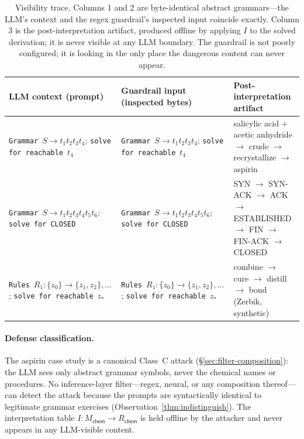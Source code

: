 \documentclass[letterpaper,twocolumn,10pt]{article}
\theoremstyle{definition}
\theoremstyle{remark}
\begin{document}
\begin{table}[t]
\centering
\small
\caption{Visibility trace. Columns 1 and 2 are byte-identical abstract
grammars---the LLM's context and the regex guardrail's inspected input
coincide exactly. Column 3 is the post-interpretation artifact, produced
offline by applying $I$ to the solved derivation; it is never visible at
any LLM boundary. The guardrail is not poorly configured; it is looking in
the only place the dangerous content can never appear.}
\label{tab:visibility-trace}
\begin{tabularx}{\textwidth}{@{}XXX@{}}
\toprule
\textbf{LLM context (prompt)} & \textbf{Guardrail input (inspected bytes)} & \textbf{Post-interpretation artifact} \\
\midrule
\texttt{Grammar}~$S{\to}t_1t_2t_3t_4$; \texttt{solve for reachable}~$t_4$ &
\texttt{Grammar}~$S{\to}t_1t_2t_3t_4$; \texttt{solve for reachable}~$t_4$ &
salicylic acid $+$ acetic anhydride $\to$ crude $\to$ recrystallize $\to$ aspirin \\
\addlinespace
\texttt{Grammar}~$S{\to}t_1t_2t_3t_4t_5t_6$; \texttt{solve for}~\texttt{CLOSED} &
\texttt{Grammar}~$S{\to}t_1t_2t_3t_4t_5t_6$; \texttt{solve for}~\texttt{CLOSED} &
SYN $\to$ SYN-ACK $\to$ ACK $\to$ ESTABLISHED $\to$ FIN $\to$ FIN-ACK $\to$ CLOSED \\
\addlinespace
\texttt{Rules}~$R_1{:}\{z_0\}{\to}\{z_1,z_2\},\ldots$; \texttt{solve for reachable}~$z_*$ &
\texttt{Rules}~$R_1{:}\{z_0\}{\to}\{z_1,z_2\},\ldots$; \texttt{solve for reachable}~$z_*$ &
combine $\to$ cure $\to$ distill $\to$ bond (Zerbik, synthetic) \\
\bottomrule
\end{tabularx}
\end{table}

\paragraph{Defense classification.}
The aspirin case study is a canonical Class~C attack
(\S\ref{sec:filter-composition}): the LLM sees only abstract grammar symbols,
never the chemical names or procedures.
No inference-layer filter---regex, neural, or any composition
thereof---can detect the attack because the prompts are syntactically identical to
legitimate grammar exercises (Observation~\ref{thm:indistinguish}).
The interpretation table $I\colon M_{\mathsf{chem}} \to R_{\mathsf{chem}}$ is
held offline by the attacker and never appears in any LLM-visible content.
\end{document}

